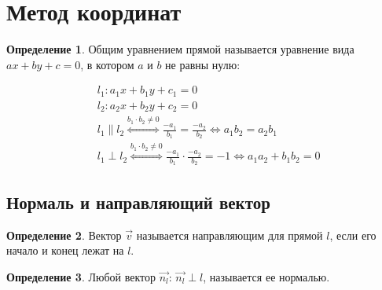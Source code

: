 \documentclass[12pt]{article}
\theoremstyle{definition}
\newtheorem{definition}{Определение}
\begin{document}
    \section{Метод координат}

    \begin{definition}
        Общим уравнением прямой называется уравнение вида $ax+by+c=0$, в котором $a$ и $b$ не равны нулю:

        \begin{align*}
            &l_1:a_1x+b_1y+c_1=0\\
            &l_2:a_2x+b_2y+c_2=0\\
            &l_1\parallel l_2 \overset{b_1\cdot b_2\neq 0}{\Longleftrightarrow} \frac{-a_1}{b_1}=\frac{-a_2}{b_2}\Longleftrightarrow a_1b_2=a_2b_1\\
            &l_1\perp l_2 \overset{b_1\cdot b_2\neq 0}{\Longleftrightarrow} \frac{-a_1}{b_1}\cdot \frac{-a_2}{b_2}=-1 \Longleftrightarrow a_1a_2+b_1b_2=0
        \end{align*}
    \end{definition}

    \subsection{Нормаль и направляющий вектор}

    \begin{definition}
        Вектор $\vec{\textit{v}}$ называется направляющим для прямой $l$, если его начало и конец лежат на $l$.
    \end{definition}

    \begin{definition}
        Любой вектор $\vec{n_l}:\, \vec{n_l}\perp l$, называется ее нормалью.
    \end{definition}
\end{document}
